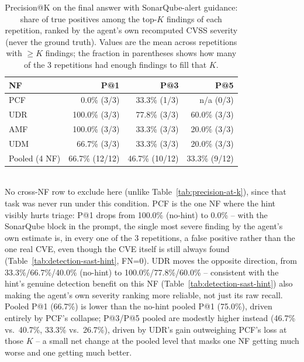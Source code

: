 \begin{table}[t]
\centering
\caption{Precision@K on the final answer with SonarQube-alert guidance: share of true positives among the top-$K$ findings of each repetition, ranked by the agent's own recomputed CVSS severity (never the ground truth). Values are the mean across repetitions with $\geq K$ findings; the fraction in parentheses shows how many of the 3 repetitions had enough findings to fill that $K$.}
\label{tab:precision-at-k-hint}
\begin{tabular}{lrrr}
\toprule
NF & P@1 & P@3 & P@5 \\
\midrule
PCF & 0.0\% (3/3)   & 33.3\% (1/3) & n/a (0/3) \\
UDR & 100.0\% (3/3) & 77.8\% (3/3) & 60.0\% (3/3) \\
AMF & 100.0\% (3/3) & 33.3\% (3/3) & 20.0\% (3/3) \\
UDM & 66.7\% (3/3)  & 33.3\% (3/3) & 20.0\% (3/3) \\
\midrule
Pooled (4 NF) & 66.7\% (12/12) & 46.7\% (10/12) & 33.3\% (9/12) \\
\bottomrule
\end{tabular}
\\[2pt]
\footnotesize{No cross-NF row to exclude here (unlike Table~\ref{tab:precision-at-k}), since that task was never run under this condition. PCF is the one NF where the hint visibly hurts triage: P@1 drops from 100.0\% (no-hint) to 0.0\% -- with the SonarQube block in the prompt, the single most severe finding by the agent's own estimate is, in every one of the 3 repetitions, a false positive rather than the one real CVE, even though the CVE itself is still always found (Table~\ref{tab:detection-sast-hint}, FN=0). UDR moves the opposite direction, from 33.3\%/66.7\%/40.0\% (no-hint) to 100.0\%/77.8\%/60.0\% -- consistent with the hint's genuine detection benefit on this NF (Table~\ref{tab:detection-sast-hint}) also making the agent's own severity ranking more reliable, not just its raw recall. Pooled P@1 (66.7\%) is lower than the no-hint pooled P@1 (75.0\%), driven entirely by PCF's collapse; P@3/P@5 pooled are modestly higher instead (46.7\% vs.\ 40.7\%, 33.3\% vs.\ 26.7\%), driven by UDR's gain outweighing PCF's loss at those $K$ -- a small net change at the pooled level that masks one NF getting much worse and one getting much better.}
\end{table}

